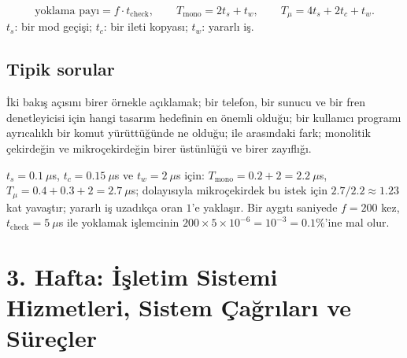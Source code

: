 \begin{keyidea}
\[
\text{yoklama payı} = f \cdot t_{\text{check}}, \qquad
T_{\text{mono}} = 2t_{s} + t_{w}, \qquad
T_{\mu} = 4t_{s} + 2t_{c} + t_{w}.
\]
$t_s$: bir mod geçişi; $t_c$: bir ileti kopyası; $t_w$: yararlı iş.
\end{keyidea}

\subsection*{Tipik sorular}
İki bakış açısını birer örnekle açıklamak; bir telefon, bir sunucu ve bir fren denetleyicisi için hangi tasarım hedefinin en önemli olduğu; bir kullanıcı programı ayrıcalıklı bir komut yürüttüğünde ne olduğu;  ile  arasındaki fark; monolitik çekirdeğin ve mikroçekirdeğin birer üstünlüğü ve birer zayıflığı.

\begin{example}
$t_s = 0.1\ \mu$s, $t_c = 0.15\ \mu$s ve $t_w = 2\ \mu$s için: $T_{\text{mono}} = 0.2 + 2 = 2.2\ \mu$s, $T_{\mu} = 0.4 + 0.3 + 2 = 2.7\ \mu$s; dolayısıyla mikroçekirdek bu istek için $2.7/2.2 \approx 1.23$ kat yavaştır; yararlı iş uzadıkça oran $1$'e yaklaşır. Bir aygıtı saniyede $f = 200$ kez, $t_{\text{check}} = 5\ \mu$s ile yoklamak işlemcinin $200 \times 5\times10^{-6} = 10^{-3} = 0.1\%$'ine mal olur.
\end{example}

\section{3. Hafta: İşletim Sistemi Hizmetleri, Sistem Çağrıları ve Süreçler}
\label{sec:w3}

